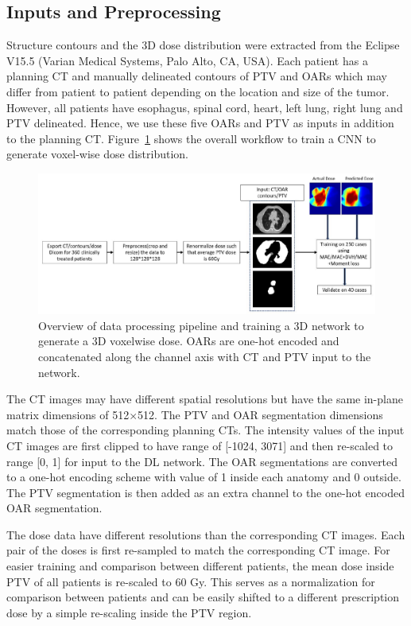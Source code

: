\documentclass[10pt]{article}
\begin{document}
\subsection{Inputs and Preprocessing}
Structure contours and the 3D dose distribution were extracted from the Eclipse V15.5 (Varian Medical Systems, Palo Alto, CA, USA). Each patient has a planning CT and manually delineated contours of PTV and OARs which may differ from patient to patient depending on the location and size of the tumor. However, all patients have esophagus, spinal cord, heart, left lung, right lung and PTV delineated. Hence, we use these five OARs and PTV as inputs in addition to the planning CT. Figure~\ref{fig:pipeline_nobeam} shows the overall workflow to train a CNN to generate voxel-wise dose distribution.
\begin{figure}[htb!]
    \centering
    \includegraphics[width=0.98\linewidth]{pipeline_nobeam1.pdf}%
    \caption{Overview of data processing pipeline and training a 3D network to generate a 3D voxelwise dose. OARs are one-hot encoded and concatenated along the channel axis with CT and PTV input to the network.}
    \label{fig:pipeline_nobeam}
\end{figure}
The CT images may have different spatial resolutions but have the same in-plane matrix dimensions of 512$\times$512. The PTV and OAR segmentation dimensions match those of the corresponding planning CTs. The intensity values of the input CT images are first clipped to have range of [-1024, 3071] and then re-scaled to range [0, 1] for input to the DL network. The OAR segmentations are converted to a one-hot encoding scheme with value of 1 inside each anatomy and 0 outside. The PTV segmentation is then added as an extra channel to the one-hot encoded OAR segmentation.

The dose data have different resolutions than the corresponding CT images. Each pair of the doses is first re-sampled to match the corresponding CT image.  For easier training and comparison between different patients, the mean dose inside PTV of all patients is re-scaled to 60 Gy. This serves as a normalization for comparison between patients and can be easily shifted to a different prescription dose by a simple re-scaling inside the PTV region. 
\end{document}
